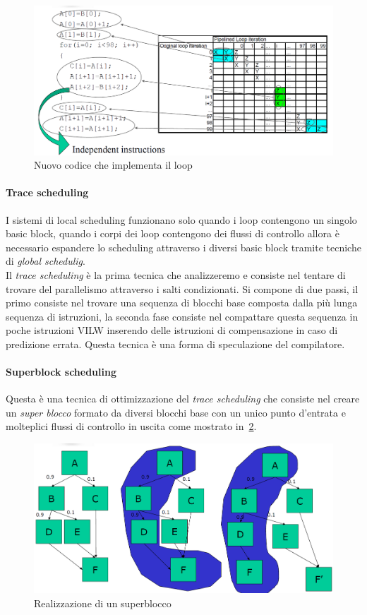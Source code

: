 \begin{figure}[htb]
\centering
\includegraphics[scale=0.4]{img/newcicle.png}
\caption{Nuovo codice che implementa il loop}\label{fig:newcicle}
\end{figure}
\paragraph{Trace scheduling}
I sistemi di local scheduling funzionano solo quando i loop contengono un singolo basic block, quando i corpi dei loop contengono dei flussi di controllo allora è necessario espandere lo scheduling attraverso i diversi basic block tramite tecniche di \emph{global schedulig}.\\
Il \emph{trace scheduling} è la prima tecnica che analizzeremo e consiste nel tentare di trovare del parallelismo attraverso i salti condizionati. Si compone di due passi, il primo consiste nel trovare una sequenza di blocchi base composta dalla più lunga sequenza di istruzioni, la seconda fase consiste nel compattare questa sequenza in poche istruzioni VILW inserendo delle istruzioni di compensazione in caso di predizione errata. Questa tecnica è una forma di speculazione del compilatore.
\paragraph{Superblock scheduling}
Questa è una tecnica di ottimizzazione del \emph{trace scheduling} che consiste nel creare un \emph{super blocco} formato da diversi blocchi base con un unico punto d'entrata e molteplici flussi di controllo in uscita come mostrato in \figurename\,\ref{fig:superblock}.
\begin{figure}[htb]
\centering
\includegraphics[scale=0.4]{img/superblock.png}
\caption{Realizzazione di un superblocco}\label{fig:superblock}
\end{figure}
